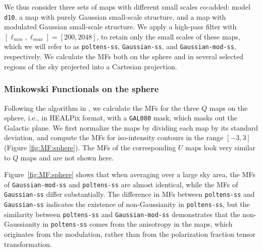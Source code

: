 \documentclass[twocolumn]{aastex631}
\begin{document}
We thus consider three sets of maps with different small scales co-added: model \texttt{d10}, a map with purely Gaussian small-scale structure, and a map with modulated Gaussian small-scale structure. %
We apply a high-pass filter with $[\ell_{min}, \ell_{max}] = [200, 2048]$, to retain only the small scales of these maps, which we will refer to as \texttt{poltens-ss}, \texttt{Gaussian-ss}, and \texttt{Gaussian-mod-ss}, respectively. We calculate the MFs both on the sphere and in several selected regions of the sky projected into a Cartesian projection. 


\subsubsection{Minkowski Functionals on the sphere}

Following the algorithm in \cite{Grewal:2022}, we calculate the MFs for the three $Q$ maps on the sphere, i.e., in HEALPix format, with a \texttt{GAL080} mask, which masks out the Galactic plane. We first normalize the maps by dividing each map by its standard deviation, and compute the MFs for iso-intensity contours in the range $[-3, 3]$ (Figure \ref{fig:MF:sphere}).  
The MFs of the corresponding $U$ maps look very similar to $Q$ maps and are not shown here.

Figure~\ref{fig:MF:sphere} shows that when averaging over a large sky area, the MFs of \texttt{Gaussian-mod-ss} and \texttt{poltens-ss} are almost identical, while the MFs of \texttt{Gaussian-ss} differ substantially. The difference in MFs between \texttt{poltens-ss} and \texttt{Gaussian-ss} indicates the existence of non-Gaussianity in \texttt{poltens-ss}, but the similarity between \texttt{poltens-ss} and \texttt{Gaussian-mod-ss} demonstrates that the non-Gaussianity in \texttt{poltens-ss} comes from the anisotropy in the maps, which originates from the modulation, rather than from the polarization fraction tensor transformation.
\end{document}
